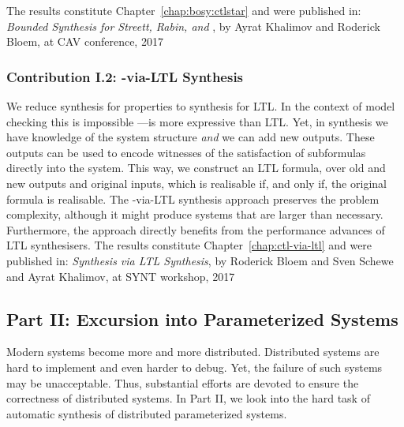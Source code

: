 The results constitute Chapter~\ref{chap:bosy:ctlstar} and were published in:
\li
{}
   \emph{Bounded Synthesis for Streett, Rabin, and \CTLstar},
   by Ayrat Khalimov and Roderick Bloem,
   at CAV conference, 2017
\il

\subsubsection*{Contribution I.2: \CTLstar-via-LTL Synthesis}

We reduce synthesis for \CTLstar properties to synthesis for LTL.
In the context of model checking this is impossible%
---\CTLstar is more expressive than LTL.
Yet, in synthesis we have knowledge of the system structure
\emph{and} we can add new outputs.
These outputs can be used to encode witnesses of
the satisfaction of \CTLstar subformulas directly into the system.
This way, we construct an LTL formula, over old and new outputs and original inputs,
which is realisable if, and only if, the original \CTLstar formula is realisable.
The \CTLstar-via-LTL synthesis approach preserves the problem complexity,
although it might produce systems that are larger than necessary.
Furthermore,
the approach directly benefits from the performance advances of LTL synthesisers.
The results constitute Chapter~\ref{chap:ctl-via-ltl} and were published in:
\li
{}
  \emph{\CTLstar Synthesis via LTL Synthesis},
  by Roderick Bloem and Sven Schewe and Ayrat Khalimov,
  at SYNT workshop, 2017
\il


\subsection*{Part II: Excursion into Parameterized Systems}


Modern systems become more and more distributed.
Distributed systems are hard to implement and even harder to debug.
Yet, the failure of such systems may be unacceptable.
Thus, substantial efforts are devoted to ensure the correctness of distributed systems.
In Part II,
we look into the hard task of automatic synthesis of distributed parameterized systems.


